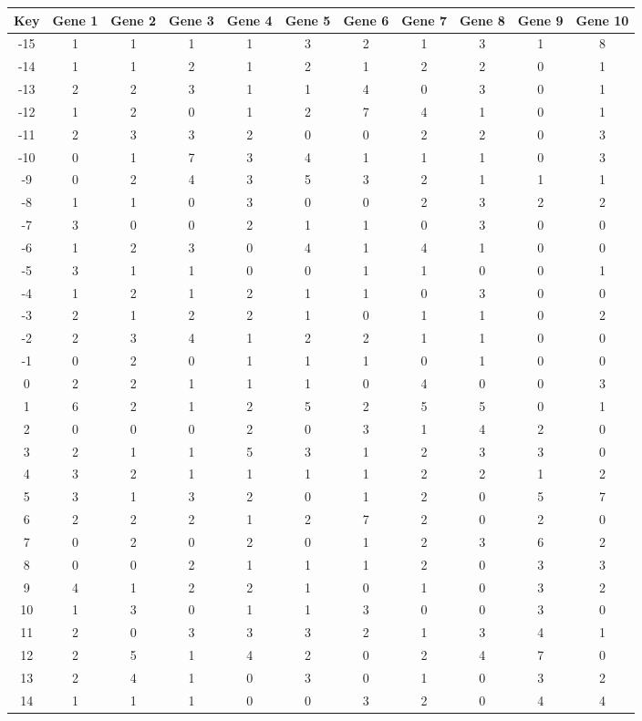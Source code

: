 \begin{tabular}{|c|c|c|c|c|c|c|c|c|c|c|}
\hline
Key & Gene 1 & Gene 2 & Gene 3 & Gene 4 & Gene 5 & Gene 6 & Gene 7 & Gene 8 & Gene 9 & Gene 10 \\
\hline
-15 & 1 & 1 & 1 & 1 & 3 & 2 & 1 & 3 & 1 & 8 \\
-14 & 1 & 1 & 2 & 1 & 2 & 1 & 2 & 2 & 0 & 1 \\
-13 & 2 & 2 & 3 & 1 & 1 & 4 & 0 & 3 & 0 & 1 \\
-12 & 1 & 2 & 0 & 1 & 2 & 7 & 4 & 1 & 0 & 1 \\
-11 & 2 & 3 & 3 & 2 & 0 & 0 & 2 & 2 & 0 & 3 \\
-10 & 0 & 1 & 7 & 3 & 4 & 1 & 1 & 1 & 0 & 3 \\
-9 & 0 & 2 & 4 & 3 & 5 & 3 & 2 & 1 & 1 & 1 \\
-8 & 1 & 1 & 0 & 3 & 0 & 0 & 2 & 3 & 2 & 2 \\
-7 & 3 & 0 & 0 & 2 & 1 & 1 & 0 & 3 & 0 & 0 \\
-6 & 1 & 2 & 3 & 0 & 4 & 1 & 4 & 1 & 0 & 0 \\
-5 & 3 & 1 & 1 & 0 & 0 & 1 & 1 & 0 & 0 & 1 \\
-4 & 1 & 2 & 1 & 2 & 1 & 1 & 0 & 3 & 0 & 0 \\
-3 & 2 & 1 & 2 & 2 & 1 & 0 & 1 & 1 & 0 & 2 \\
-2 & 2 & 3 & 4 & 1 & 2 & 2 & 1 & 1 & 0 & 0 \\
-1 & 0 & 2 & 0 & 1 & 1 & 1 & 0 & 1 & 0 & 0 \\
0 & 2 & 2 & 1 & 1 & 1 & 0 & 4 & 0 & 0 & 3 \\
1 & 6 & 2 & 1 & 2 & 5 & 2 & 5 & 5 & 0 & 1 \\
2 & 0 & 0 & 0 & 2 & 0 & 3 & 1 & 4 & 2 & 0 \\
3 & 2 & 1 & 1 & 5 & 3 & 1 & 2 & 3 & 3 & 0 \\
4 & 3 & 2 & 1 & 1 & 1 & 1 & 2 & 2 & 1 & 2 \\
5 & 3 & 1 & 3 & 2 & 0 & 1 & 2 & 0 & 5 & 7 \\
6 & 2 & 2 & 2 & 1 & 2 & 7 & 2 & 0 & 2 & 0 \\
7 & 0 & 2 & 0 & 2 & 0 & 1 & 2 & 3 & 6 & 2 \\
8 & 0 & 0 & 2 & 1 & 1 & 1 & 2 & 0 & 3 & 3 \\
9 & 4 & 1 & 2 & 2 & 1 & 0 & 1 & 0 & 3 & 2 \\
10 & 1 & 3 & 0 & 1 & 1 & 3 & 0 & 0 & 3 & 0 \\
11 & 2 & 0 & 3 & 3 & 3 & 2 & 1 & 3 & 4 & 1 \\
12 & 2 & 5 & 1 & 4 & 2 & 0 & 2 & 4 & 7 & 0 \\
13 & 2 & 4 & 1 & 0 & 3 & 0 & 1 & 0 & 3 & 2 \\
14 & 1 & 1 & 1 & 0 & 0 & 3 & 2 & 0 & 4 & 4 \\
\hline
\end{tabular}